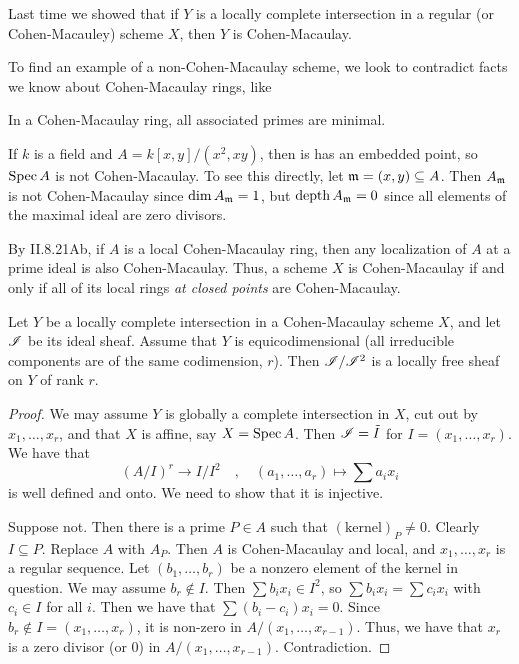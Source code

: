  \setcounter{lecture}{20}

Last time we showed that if $Y$ is a locally complete intersection
in a regular (or Cohen-Macauley) scheme $X$, then $Y$ is
Cohen-Macaulay.

To find an example of a non-Cohen-Macaulay scheme, we look to
contradict facts we know about Cohen-Macaulay rings, like

\begin{theorem} In a Cohen-Macaulay ring, all
associated primes are minimal. \end{theorem}

If $k$ is a field and $A=k[x,y]/(x^2,xy)$, then is has an embedded
point, so $\text{\rm Spec\,} A$ is not Cohen-Macaulay.  To see this directly,
let $\mathfrak{m}=(x,y)\subseteq A$.  Then $A_{\mathfrak{m}}$ is not Cohen-Macaulay
since $\dim A_{\mathfrak{m}}=1$, but $\text{\rm depth}\, A_{\mathfrak{m}}=0$ since all elements of
the maximal ideal are zero divisors.

By II.8.21Ab, if $A$ is a local Cohen-Macaulay ring, then any
localization of $A$ at a prime ideal is also Cohen-Macaulay. Thus,
a scheme $X$ is Cohen-Macaulay if and only if all of its local
rings \emph{at closed points} are Cohen-Macaulay.

 \begin{remark}
 Let $Y$ be a locally complete intersection in a Cohen-Macaulay
 scheme $X$, and let $\mathscr{I}$ be its ideal sheaf.  Assume that $Y$ is
 equicodimensional (all irreducible components are of the same
 codimension, $r$).  Then $\mathscr{I}/\mathscr{I}^2$ is a locally free sheaf on $Y$
 of rank $r$.
 \begin{proof}
 We may assume $Y$ is globally a complete intersection in $X$, cut
 out by $x_1,\dots, x_r$, and that $X$ is affine, say $X=\text{\rm Spec\,} A$.
  Then $\mathscr{I}=\tilde I$ for $I=(x_1,\dots, x_r)$.  We have that
  \[
    (A/I)^r\to I/I^2\quad,\quad (a_1,\dots,a_r)\mapsto \sum a_ix_i
  \]
  is well defined and onto.  We need to show that it is injective.

  Suppose not.  Then there is a prime $P\in A$ such that
  $(\text{kernel})_P \not =0$.  Clearly $I\subseteq P$.  Replace
  $A$ with $A_P$.  Then $A$ is Cohen-Macaulay and local, and
  $x_1,\dots,x_r$ is a regular sequence.  Let $(b_1,\dots, b_r)$
  be a nonzero element of the kernel in question.  We may assume
  $b_r\not\in I$.  Then $\sum b_ix_i \in I^2$, so $\sum b_ix_i =
  \sum c_ix_i$ with $c_i\in I$ for all $i$.  Then we have that
  $\sum (b_i-c_i)x_i = 0$.  Since $b_r\not\in I=(x_1,\dots, x_r)$,
  it is non-zero in $A/(x_1,\dots, x_{r-1})$.  Thus, we have that
  $x_r$ is a zero divisor (or 0) in $A/(x_1,\dots, x_{r-1})$.
  Contradiction.
  \end{proof}
  \end{remark}

